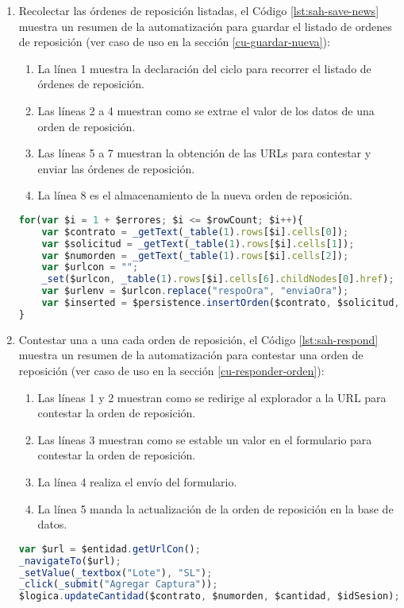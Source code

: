 \begin{enumerate}
	\item Recolectar las órdenes de reposición listadas, el Código \ref{lst:sah-save-news} muestra un resumen de la automatización para guardar el listado de ordenes de reposición (ver caso de uso en la sección \ref{cu-guardar-nueva}):
	\begin{enumerate}
		\item La línea 1 muestra la declaración del ciclo para recorrer el listado de órdenes de reposición.
		\item Las líneas 2 a 4 muestran como se extrae el valor de los datos de una orden de reposición.
		\item Las líneas 5 a 7 muestran la obtención de las URLs para contestar y enviar las órdenes de reposición.
		\item La línea 8 es el almacenamiento de la nueva orden de reposición. 
	\end{enumerate}
	\begin{lstlisting}[language=Javascript, caption={Guardar lista de órdenes de reposición.}, captionpos=b, label={lst:sah-save-news}]
for(var $i = 1 + $errores; $i <= $rowCount; $i++){
	var $contrato = _getText(_table(1).rows[$i].cells[0]);
	var $solicitud = _getText(_table(1).rows[$i].cells[1]);
	var $numorden = _getText(_table(1).rows[$i].cells[2]);
	var $urlcon = "";
	_set($urlcon, _table(1).rows[$i].cells[6].childNodes[0].href);
	var $urlenv = $urlcon.replace("respoOra", "enviaOra");
	var $inserted = $persistence.insertOrden($contrato, $solicitud, $numorden, $expedicion, $almacen, $urlcon, $urlenv, $idSesion);
}
	\end{lstlisting}

	\item Contestar una a una cada orden de reposición, el Código \ref{lst:sah-respond} muestra un resumen de la automatización para contestar una orden de reposición (ver caso de uso en la sección \ref{cu-responder-orden}):
	\begin{enumerate}
		\item Las líneas 1 y 2 muestran como se redirige al explorador a la URL para contestar la orden de reposición.
		\item  Las líneas 3 muestran como se estable un valor en el formulario para contestar la orden de reposición.
		\item La línea 4 realiza el envío del formulario.
		\item La línea 5 manda la actualización de la orden de reposición en la base de datos.
	\end{enumerate}
	\begin{lstlisting}[language=Javascript, caption={Responder orden de reposición.}, captionpos=b, label={lst:sah-respond}]
var $url = $entidad.getUrlCon();
_navigateTo($url);
_setValue(_textbox("Lote"), "SL");
_click(_submit("Agregar Captura"));
$logica.updateCantidad($contrato, $numorden, $cantidad, $idSesion);
	\end{lstlisting}


\end{enumerate}
